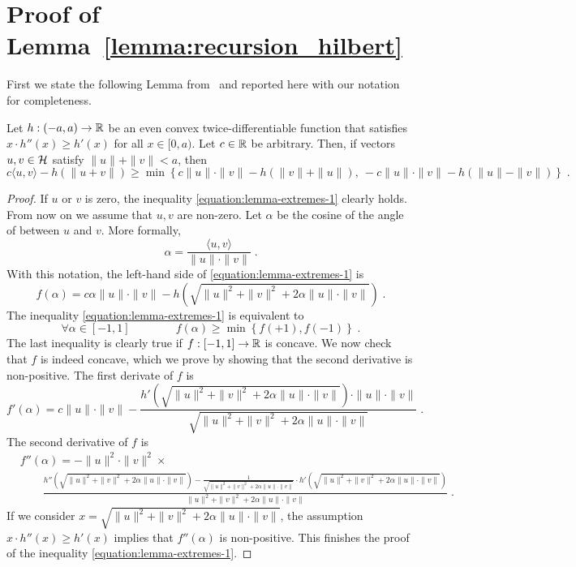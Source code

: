 \section{Proof of Lemma~\ref{lemma:recursion_hilbert}}
\label{section:hilbert-space-reduction}

First we state the following Lemma from~\cite{McMahanO14} and reported here with our notation for completeness.
\begin{lemma}[Extremes]
\label{lemma:extremes}
Let $h:(-a,a) \to \mathbb{R}$ be an even convex twice-differentiable function that
satisfies $x \cdot h''(x) \ge h'(x)$ for all $x \in [0,a)$. Let $c \in \mathbb{R}$
be arbitrary. Then, if vectors $u,v \in \mathcal{H}$ satisfy $\|u\| + \|v\| < a$, then
\begin{equation}
\label{equation:lemma-extremes-1}
c \langle u, v \rangle - h(\|u + v\|) \ge \min \left\{ c \|u\| \cdot \|v\| - h(\|v\| + \|u\|), \ - c \|u\| \cdot \|v\| - h(\|u\| - \|v\|) \right\} \; .
\end{equation}
\end{lemma}
%
\begin{proof}
If $u$ or $v$ is zero, the inequality \eqref{equation:lemma-extremes-1} clearly
holds. From now on we assume that $u,v$ are non-zero. Let $\alpha$ be the cosine
of the angle of between $u$ and $v$. More formally,
$$
\alpha = \frac{\langle u, v \rangle}{\|u\| \cdot \|v\|} \; .
$$
With this notation, the left-hand side of \eqref{equation:lemma-extremes-1} is
$$
f(\alpha) = c \alpha \|u\| \cdot \|v\| - h(\sqrt{\|u\|^2 + \|v\|^2 + 2 \alpha \|u\| \cdot \|v\|}) \; .
$$
The inequality \eqref{equation:lemma-extremes-1} is equivalent to
$$
\forall \alpha \in [-1,1] \qquad \qquad f(\alpha) \ge \min \left\{f(+1), f(-1)\right\} \; .
$$
The last inequality is clearly true if $f:[-1,1] \to \mathbb{R}$ is concave. We now
check that $f$ is indeed concave, which we prove by showing that the second
derivative is non-positive. The first derivate of $f$ is
$$
f'(\alpha) = c \|u\| \cdot \|v\| - \frac{h'(\sqrt{\|u\|^2 + \|v\|^2 + 2 \alpha \|u\| \cdot \|v\|}) \cdot \|u\| \cdot \|v\|}{\sqrt{\|u\|^2 + \|v\|^2 + 2 \alpha \|u\| \cdot \|v\|}} \; .
$$
The second derivative of $f$ is
\begin{align*}
&f''(\alpha) = - \|u\|^2 \cdot \|v\|^2 \times \\
&\qquad \frac{h''(\sqrt{\|u\|^2 + \|v\|^2 + 2 \alpha \|u\| \cdot \|v\|})  - \frac{1}{\sqrt{\|u\|^2 + \|v\|^2 + 2\alpha \|u\| \cdot \|v\|}} \cdot h'(\sqrt{\|u\|^2 + \|v\|^2 + 2 \alpha \|u\| \cdot \|v\|})  }{\|u\|^2 + \|v\|^2 + 2 \alpha \|u\| \cdot \|v\|} \; .
\end{align*}
If we consider $x = \sqrt{\|u\|^2 + \|v\|^2 + 2 \alpha \|u\| \cdot \|v\|}$, the
assumption $x \cdot h''(x) \ge h'(x)$ implies that $f''(\alpha)$ is non-positive.
This finishes the proof of the inequality \eqref{equation:lemma-extremes-1}.
\end{proof}

